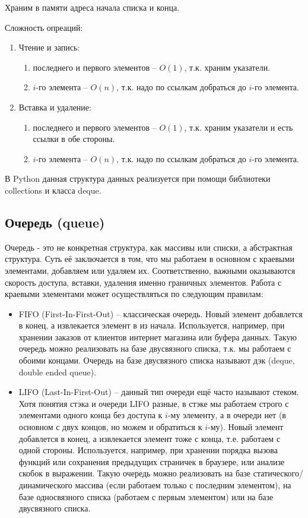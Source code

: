 \documentclass{article}
\begin{document}
Храним в памяти адреса начала списка и конца.

Сложность опреаций:
\begin{enumerate}
    \item Чтение и запись:
    \begin{enumerate}
        \item последнего и первого элементов -- $O(1)$, т.к. храним указатели.
        \item $i$-го элемента -- $O(n)$, т.к. надо по ссылкам добраться до $i$-го элемента.
    \end{enumerate} 
    \item Вставка и удаление:
    \begin{enumerate}
        \item последнего и первого элементов -- $O(1)$, т.к. храним указатели и есть ссылки в обе стороны.
        \item $i$-го элемента -- $O(n)$, т.к. надо по ссылкам добраться до $i$-го элемента.
    \end{enumerate}
\end{enumerate}

В Python данная структура данных реализуется при помощи библиотеки collections и класса deque.


\subsection{Очередь (queue)}

Очередь - это не конкретная структура, как массивы или списки, а абстрактная структура. Суть её заключается в том, что мы работаем в основном с краевыми элементами, добавляем или удаляем их.
Соответственно, важными оказываются скорость доступа, вставки, удаления именно граничных элементов.
Работа с краевыми элементами может осуществляться по следующим правилам: 
\begin{itemize}
    \item FIFO (First-In-First-Out) -- классическая очередь. Новый элемент добавлется в конец, а извлекается элемент в из начала. 
Используется, например, при хранении заказов от клиентов интернет магазина или буфера данных. Такую очередь можно реализовать на базе двусвязного списка, т.к. мы работаем с обоими концами.
Очередь на базе двусвязного списка называют дэк (deque, double ended queue).
    \item LIFO (Last-In-First-Out) -- данный тип очереди ещё часто называют стеком. Хотя понятия стэка и очереди LIFO разные, в стэке мы работаем строго с элементами одного конца без доступа к $i$-му элементу,
    а в очереди нет (в основном с двух концов, но можем и обратиться к $i$-му). Новый элемент добавлется в конец, а извлекается элемент тоже с конца, т.е. работаем с одной стороны.
Используется, например, при хранении порядка вызова функций или сохранения предыдущих страничек в браузере, или анализе скобок в выражении. Такую очередь можно реализовать на базе статического/динамического массива (если работаем
только с последним элементом), на базе односвязного списка (работаем с первым элементом) или на базе двусвязного списка.
\end{itemize}
\end{document}
